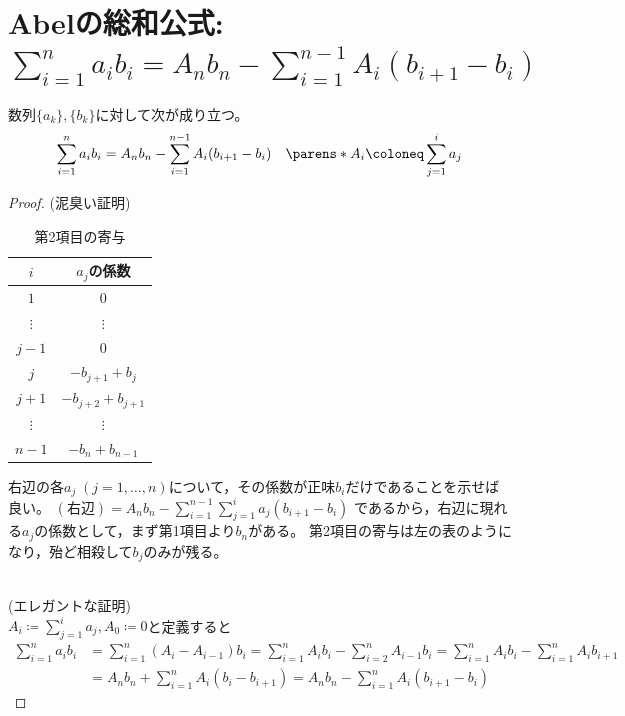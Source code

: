     \section{Abelの総和公式: \texorpdfstring{$\sum_{i=1}^n a_ib_i = A_nb_n - \sum_{i=1}^{n-1}A_i(b_{i+1}-b_i)$}{Σ\_\{i=1\}\string^n a\_i b\_i = A\_n b\_n - Σ\_\{i=1\}\string^(n-1) A\_i(b\_(i+1) - b\_i)}}
        \begin{shadebox}
            数列$\{a_k\},\{b_k\}$に対して次が成り立つ。
            \[ \sum_{i=1}^n a_ib_i = A_nb_n - \sum_{i=1}^{n-1}A_i(b_{i+1}-b_i) \quad \parens*{ A_i \coloneq \sum_{j=1}^i a_j } \]
        \end{shadebox}
        \begin{proof}
            (泥臭い証明)\\
            \begin{minipage}{0.45\hsize}
                \begin{table}[H]
                    \centering
                    \caption{第2項目の寄与}
                    \begin{tabular}{cc}
                        $i$            & $a_j$の係数\\\hline\hline
                        $1$            & $0$\\
                        $\vdots$    & $\vdots$\\
                        $j-1$        & $0$\\
                        $j$            & $-b_{j+1} + b_j$\\
                        $j+1$        & $-b_{j+2} + b_{j+1}$\\
                        $\vdots$    & $\vdots$\\
                        $n-1$        & $-b_n + b_{n-1}$\\\hline
                    \end{tabular}
                \end{table}
            \end{minipage}
            \begin{minipage}{0.45\hsize}
                右辺の各$a_j\;(j=1,\dotsc,n)$について，その係数が正味$b_i$だけであることを示せば良い。
                $(\text{右辺}) = A_nb_n - \sum_{i=1}^{n-1}\sum_{j=1}^ia_j(b_{i+1}-b_i)$
                であるから，右辺に現れる$a_j$の係数として，まず第1項目より$b_n$がある。
                第2項目の寄与は左の表のようになり，殆ど相殺して$b_j$のみが残る。
            \end{minipage}\\
            \newline
            (エレガントな証明)\\
            \quad $A_i \coloneq \sum_{j=1}^i a_j,A_0 \coloneq 0$と定義すると
            \begin{align*}
                \sum_{i=1}^n a_ib_i &= \sum_{i=1}^n (A_i-A_{i-1})b_i = \sum_{i=1}^n A_ib_i - \sum_{i=2}^n A_{i-1}b_i = \sum_{i=1}^n A_ib_i - \sum_{i=1}^n A_{i}b_{i+1} \\
                &= A_nb_n + \sum_{i=1}^n A_i(b_i-b_{i+1}) = A_nb_n - \sum_{i=1}^n A_i(b_{i+1} - b_i)
            \end{align*}
        \end{proof}
